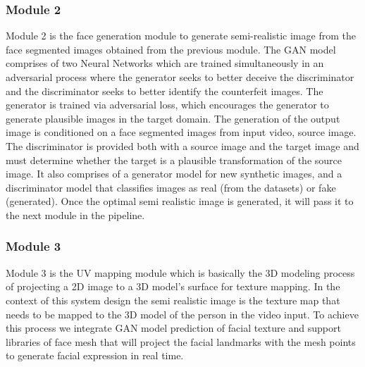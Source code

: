 \documentclass[12pt, a4paper]{report}
\begin{document}
\subsubsection{Module 2}
\item Module 2 is the face generation module to  generate semi-realistic image from the face segmented images obtained from the previous module. The GAN model comprises of two Neural Networks which are trained simultaneously in an adversarial
process where the generator seeks to better deceive the
discriminator and the discriminator seeks to better identify the
counterfeit images.
The generator is trained via adversarial loss, which encourages the
generator to generate plausible images in the target domain.
The generation of the output image is conditioned on a face segmented images from input video, source image. The discriminator is provided both with a source image and the
target image and must determine whether the target is a plausible
transformation of the source image. It also comprises of a generator model for new synthetic images, and a discriminator model that classifies images as real (from the
datasets) or fake (generated). Once the optimal semi realistic image is generated, it will pass it to the next module in the pipeline.

\subsubsection{Module 3}
\item Module 3 is the UV mapping module which is basically the 3D modeling process of projecting a 2D image to a 3D model’s surface for texture mapping. In the context of this system design the semi realistic image is the texture map that needs to be mapped to the 3D model of the person in the video input. To achieve this process we integrate GAN model prediction of facial texture and support libraries of face mesh that will project the facial landmarks with the mesh points to generate  facial expression in real time.  
\end{document}
